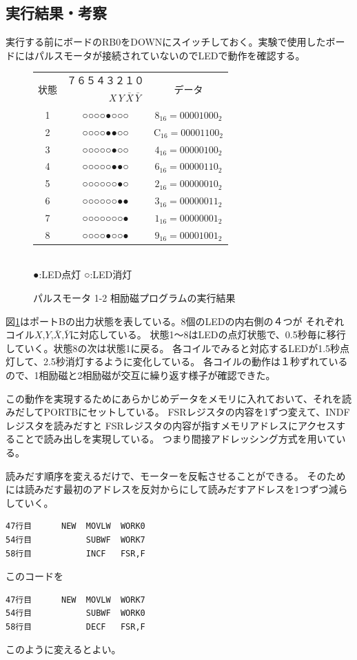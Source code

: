 \documentclass[a4paper,12pt]{ujarticle}
\begin{document}
    \subsection{実行結果・考察}
    実行する前にボードのRB0をDOWNにスイッチしておく。実験で使用したボードにはパルスモータが接続されていないのでLEDで動作を確認する。
    \begin{figure}[htbp]
     \begin{center}
       \begin{tabular}{c|c|c}\hline
        \multirow{2}{*}{状態}&７６５４３２１０ & \multirow{2}{*}{データ}\\
        &　　　　$X$\,$Y$\,$\bar{X}$\,$\bar{Y}$\\ \hline
         1&○○○○●○○○ & $8_{16}=00001000_2$ \\
         2&○○○○●●○○ & C$_{16}=00001100_2$\\
         3&○○○○○●○○ & $4_{16}=00000100_2$\\
         4&○○○○○●●○ & $6_{16}=00000110_2$\\
         5&○○○○○○●○ & $2_{16}=00000010_2$\\
         6&○○○○○○●● & $3_{16}=00000011_2$\\
         7&○○○○○○○● & $1_{16}=00000001_2$\\
         8&○○○○●○○● & $9_{16}=00001001_2$\\ \hline
       \end{tabular}\\
      ●:LED点灯 ○:LED消灯
      \caption{パルスモータ 1-2 相励磁プログラムの実行結果}
      \label{fig:out_5-12}
     \end{center}
    \end{figure}

    図\ref{fig:out_5-12}はポートBの出力状態を表している。8個のLEDの内右側の４つが
    それぞれコイル$X$,$Y$,$\bar{X}$,$\bar{Y}$に対応している。
    状態1〜8はLEDの点灯状態で、0.5秒毎に移行していく。状態8の次は状態1に戻る。
    各コイルでみると対応するLEDが1.5秒点灯して、2.5秒消灯するように変化している。
    各コイルの動作は１秒ずれているので、1相励磁と2相励磁が交互に繰り返す様子が確認できた。

    この動作を実現するためにあらかじめデータをメモリに入れておいて、それを読みだしてPORTBにセットしている。
    FSRレジスタの内容を1ずつ変えて、INDFレジスタを読みだすと
    FSRレジスタの内容が指すメモリアドレスにアクセスすることで読み出しを実現している。
    つまり間接アドレッシング方式を用いている。

    読みだす順序を変えるだけで、モーターを反転させることができる。
    そのためには読みだす最初のアドレスを反対からにして読みだすアドレスを1つずつ減らしていく。
     \begin{lstlisting}[basicstyle=\ttfamily\footnotesize, frame=single]
47行目      NEW  MOVLW  WORK0
54行目           SUBWF  WORK7
58行目           INCF   FSR,F
     \end{lstlisting}
     このコードを
     \begin{lstlisting}[basicstyle=\ttfamily\footnotesize, frame=single]
47行目      NEW  MOVLW  WORK7
54行目           SUBWF  WORK0
58行目           DECF   FSR,F
     \end{lstlisting}
     このように変えるとよい。
\end{document}
